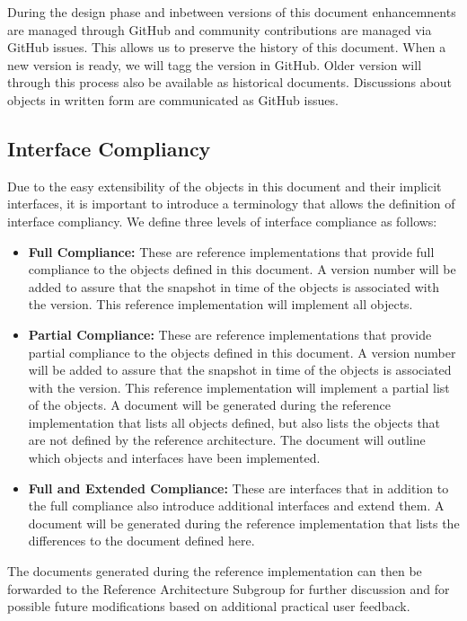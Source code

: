 \documentclass[9pt,]{article}
\begin{document}
During the design phase and inbetween versions of this document
enhancemnents are managed through GitHub and community contributions are
managed via GitHub issues. This allows us to preserve the history of
this document. When a new version is ready, we will tagg the version in
GitHub. Older version will through this process also be available as
historical documents. Discussions about objects in written form are
communicated as GitHub issues.

\hypertarget{interface-compliancy}{%
\subsection{Interface Compliancy}\label{interface-compliancy}}

Due to the easy extensibility of the objects in this document and their
implicit interfaces, it is important to introduce a terminology that
allows the definition of interface compliancy. We define three levels of
interface compliance as follows:

\begin{itemize}
\item
  \textbf{Full Compliance:} These are reference implementations that
  provide full compliance to the objects defined in this document. A
  version number will be added to assure that the snapshot in time of
  the objects is associated with the version. This reference
  implementation will implement all objects.
\item
  \textbf{Partial Compliance:} These are reference implementations that
  provide partial compliance to the objects defined in this document. A
  version number will be added to assure that the snapshot in time of
  the objects is associated with the version. This reference
  implementation will implement a partial list of the objects. A
  document will be generated during the reference implementation that
  lists all objects defined, but also lists the objects that are not
  defined by the reference architecture. The document will outline which
  objects and interfaces have been implemented.
\item
  \textbf{Full and Extended Compliance:} These are interfaces that in
  addition to the full compliance also introduce additional interfaces
  and extend them. A document will be generated during the reference
  implementation that lists the differences to the document defined
  here.
\end{itemize}

The documents generated during the reference implementation can then be
forwarded to the Reference Architecture Subgroup for further discussion
and for possible future modifications based on additional practical user
feedback.
\end{document}
